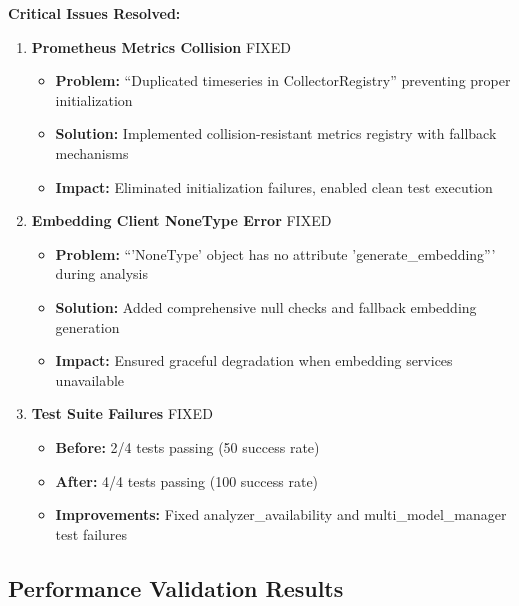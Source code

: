 \textbf{Critical Issues Resolved:}

\begin{enumerate}[leftmargin=*,topsep=2pt,itemsep=2pt,parsep=0pt]
    \item \textbf{Prometheus Metrics Collision} \checkmarkcustom{} FIXED
    \begin{itemize}[leftmargin=*,topsep=1pt,itemsep=1pt,parsep=0pt]
        \item \textbf{Problem:} ``Duplicated timeseries in CollectorRegistry'' preventing proper initialization
        \item \textbf{Solution:} Implemented collision-resistant metrics registry with fallback mechanisms
        \item \textbf{Impact:} Eliminated initialization failures, enabled clean test execution
    \end{itemize}
    
    \item \textbf{Embedding Client NoneType Error} \checkmarkcustom{} FIXED
    \begin{itemize}[leftmargin=*,topsep=1pt,itemsep=1pt,parsep=0pt]
        \item \textbf{Problem:} ``'NoneType' object has no attribute 'generate\_embedding''' during analysis
        \item \textbf{Solution:} Added comprehensive null checks and fallback embedding generation
        \item \textbf{Impact:} Ensured graceful degradation when embedding services unavailable
    \end{itemize}
    
    \item \textbf{Test Suite Failures} \checkmarkcustom{} FIXED
    \begin{itemize}[leftmargin=*,topsep=1pt,itemsep=1pt,parsep=0pt]
        \item \textbf{Before:} 2/4 tests passing (50\percent{} success rate)
        \item \textbf{After:} 4/4 tests passing (100\percent{} success rate)
        \item \textbf{Improvements:} Fixed analyzer\_availability and multi\_model\_manager test failures
    \end{itemize}
\end{enumerate}

\subsection{Performance Validation Results}

